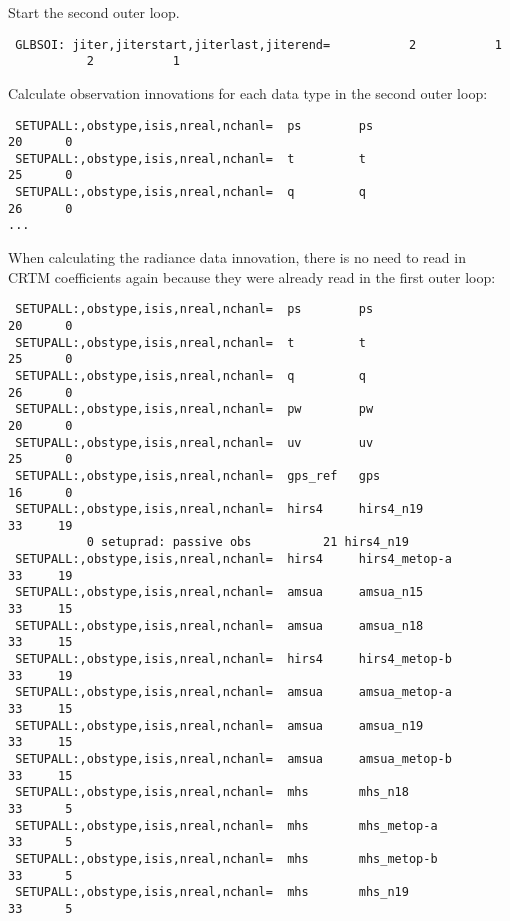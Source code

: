 Start the second outer loop.
\begin{scriptsize}
\begin{verbatim}
 GLBSOI: jiter,jiterstart,jiterlast,jiterend=           2           1
           2           1
\end{verbatim}
\end{scriptsize}
Calculate observation innovations for each data type in the second outer loop:
\begin{scriptsize}
\begin{verbatim}
 SETUPALL:,obstype,isis,nreal,nchanl=  ps        ps                       20      0
 SETUPALL:,obstype,isis,nreal,nchanl=  t         t                        25      0
 SETUPALL:,obstype,isis,nreal,nchanl=  q         q                        26      0
...
\end{verbatim}
\end{scriptsize}

When calculating the radiance data innovation, there is no need to read in CRTM coefficients again because they were already read in the first outer loop: 
\begin{scriptsize}
\begin{verbatim}
 SETUPALL:,obstype,isis,nreal,nchanl=  ps        ps                       20      0
 SETUPALL:,obstype,isis,nreal,nchanl=  t         t                        25      0
 SETUPALL:,obstype,isis,nreal,nchanl=  q         q                        26      0
 SETUPALL:,obstype,isis,nreal,nchanl=  pw        pw                       20      0
 SETUPALL:,obstype,isis,nreal,nchanl=  uv        uv                       25      0
 SETUPALL:,obstype,isis,nreal,nchanl=  gps_ref   gps                      16      0
 SETUPALL:,obstype,isis,nreal,nchanl=  hirs4     hirs4_n19                33     19
           0 setuprad: passive obs          21 hirs4_n19
 SETUPALL:,obstype,isis,nreal,nchanl=  hirs4     hirs4_metop-a            33     19
 SETUPALL:,obstype,isis,nreal,nchanl=  amsua     amsua_n15                33     15
 SETUPALL:,obstype,isis,nreal,nchanl=  amsua     amsua_n18                33     15
 SETUPALL:,obstype,isis,nreal,nchanl=  hirs4     hirs4_metop-b            33     19
 SETUPALL:,obstype,isis,nreal,nchanl=  amsua     amsua_metop-a            33     15
 SETUPALL:,obstype,isis,nreal,nchanl=  amsua     amsua_n19                33     15
 SETUPALL:,obstype,isis,nreal,nchanl=  amsua     amsua_metop-b            33     15
 SETUPALL:,obstype,isis,nreal,nchanl=  mhs       mhs_n18                  33      5
 SETUPALL:,obstype,isis,nreal,nchanl=  mhs       mhs_metop-a              33      5
 SETUPALL:,obstype,isis,nreal,nchanl=  mhs       mhs_metop-b              33      5
 SETUPALL:,obstype,isis,nreal,nchanl=  mhs       mhs_n19                  33      5
\end{verbatim}
\end{scriptsize}

